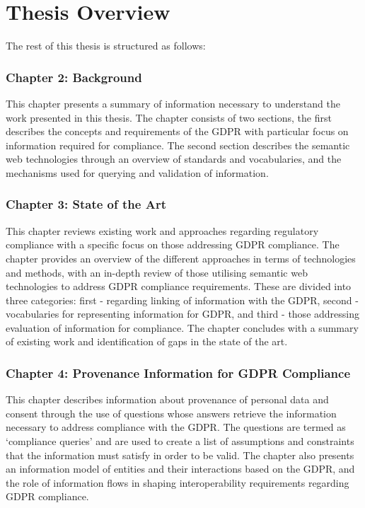 \section{Thesis Overview}
The rest of this thesis is structured as follows:

\subsubsection{Chapter 2: Background}
This chapter presents a summary of information necessary to understand the work presented in this thesis. The chapter consists of two sections, the first describes the concepts and requirements of the GDPR with particular focus on information required for compliance. The second section describes the semantic web technologies through an overview of standards and vocabularies, and the mechanisms used for querying and validation of information.

\subsubsection{Chapter 3: State of the Art}
This chapter reviews existing work and approaches regarding regulatory compliance with a specific focus on those addressing GDPR compliance. The chapter provides an overview of the different approaches in terms of technologies and methods, with an in-depth review of those utilising semantic web technologies to address GDPR compliance requirements. These are divided into three categories: first - regarding linking of information with the GDPR, second - vocabularies for representing information for GDPR, and third - those addressing evaluation of information for compliance. The chapter concludes with a summary of existing work and identification of gaps in the state of the art.

\subsubsection{Chapter 4: Provenance Information for GDPR Compliance}
This chapter describes information about provenance of personal data and consent through the use of questions whose answers retrieve the information necessary to address compliance with the GDPR. The questions are termed as `compliance queries' and are used to create a list of assumptions and constraints that the information must satisfy in order to be valid. The chapter also presents  an information model of entities and their interactions based on the GDPR, and the role of information flows in shaping interoperability requirements regarding GDPR compliance.

